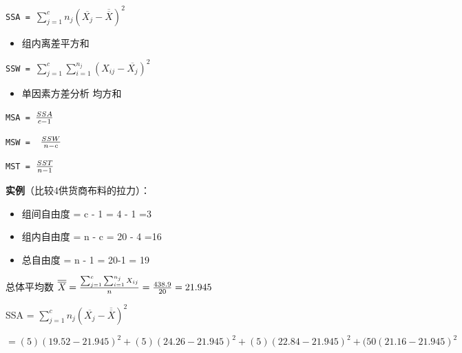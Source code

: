 \texttt{SSA~=~}\(\sum_{j=1}^c n_j(\overline{X_j} - \overline{\overline{X}})^2\)

\begin{description}
\item[]
\end{description}

\begin{itemize}
\tightlist
\item
  组内离差平方和\\
\end{itemize}

\texttt{SSW~=~}\(\sum_{j=1}^c \sum_{i=1}^{n_j} (X_{ij} - \overline{X_j})^2\)

\begin{description}
\item[]
\end{description}

\begin{itemize}
\tightlist
\item
  单因素方差分析 均方和
\end{itemize}

\texttt{MSA~=~}\({SSA \over c -1}\)

\texttt{MSW~=~~}\({SSW \over n -c}\)

\texttt{MST~=~}\({SST \over n -1}\)

\textbf{实例}（比较4供货商布料的拉力）：

\begin{itemize}
\tightlist
\item
  组间自由度 = c - 1 = 4 - 1 =3
\item
  组内自由度 = n - c = 20 - 4 =16
\item
  总自由度 = n - 1 = 20-1 = 19
\end{itemize}

总体平均数
\(\overline{\overline{X}} = {\sum_{j=1}^c \sum_{i=1}^{n_j} X_{ij} \over n} = {438.9 \over 20}= 21.945\)

SSA = \(\sum_{j=1}^c n_j(\overline{X_j} - \overline{\overline{X}})^2\)

\[= (5)(19.52 - 21.945)^2 + (5)(24.26 - 21.945)^2 + (5)(22.84 - 21.945)^2 + (50(21.16 - 21.945)^2\]


